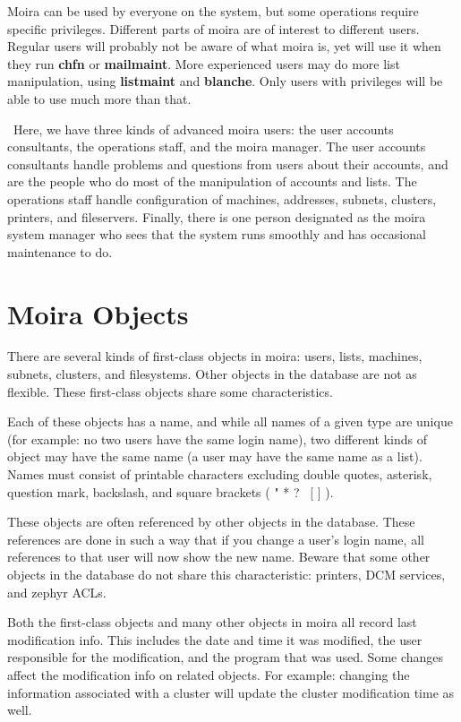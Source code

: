 \documentclass{book}
\begin{document}
Moira can be used by everyone on the system, but some operations
require specific privileges.  Different parts of moira
are of interest to different users.  Regular users will probably not
be aware of what moira is, yet will use it when they run {\bf chfn} or
{\bf mailmaint}.  More experienced users may do more list manipulation,
using {\bf listmaint} and {\bf blanche}.  Only users with privileges will
be able to use much more than that.

\athena\ Here, we have three kinds of advanced moira users: the user
accounts consultants, the operations staff, and the moira manager.
The user accounts consultants handle problems and questions from users
about their accounts, and are the people who do most of the
manipulation of accounts and lists.  The operations staff handle
configuration of machines, addresses, subnets, clusters, printers, and
fileservers.  Finally, there is one person designated as the moira
system manager who sees that the system runs smoothly and has
occasional maintenance to do.

\section{Moira Objects}

There are several kinds of first-class objects in moira: users, lists,
machines, subnets, clusters, and filesystems.  Other objects in the
database are not as flexible.  These first-class objects share some
characteristics.

Each of these objects has a name, and while all names of a given type
are unique (for example: no two users have the same login name), two different
kinds of object may have the same name (a user may have the same name
as a list).  Names must consist of printable characters excluding
double quotes, asterisk, question mark, backslash, and square brackets
( " * ? \ [ ] ).

These objects are often referenced by other objects in the database.
These references are done in such a way that if you change a user's
login name, all references to that user will now show the new name.
Beware that some other objects in the database do not share this
characteristic: printers, DCM services, and zephyr ACLs.

Both the first-class objects and many other objects in moira all record
last modification info.  This includes the date and time it was
modified, the user responsible for the modification, and the program
that was used.  Some changes affect the modification info on related
objects.  For example: changing the information associated with a
cluster will update the cluster modification time as well.
\end{document}
